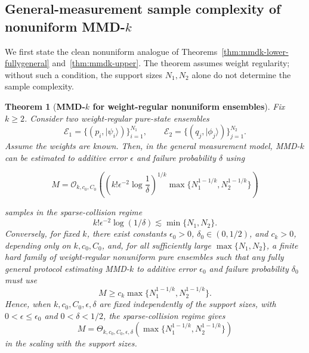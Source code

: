 \documentclass[aps,prx,reprint,superscriptaddress,amsmath,amssymb,longbibliography,floatfix]{revtex4-2}
\providecommand{\ket}[1]{|#1 \rangle}
\newcommand{\scE}{\mathcal{E}}
\newcommand{\scO}{\mathcal{O}}
\theoremstyle{plain}
\newtheorem{theorem}{Theorem}[section]
\theoremstyle{definition}
\theoremstyle{remark}
\begin{document}
\subsection{General-measurement sample complexity of nonuniform MMD-\(k\)}

We first state the clean nonuniform analogue of Theorems~\ref{thm:mmdk-lower-fullygeneral} and~\ref{thm:mmdk-upper}. The theorem assumes weight regularity; without such a condition, the support sizes \(N_1,N_2\) alone do not determine the sample complexity.

\begin{theorem}[\textbf{MMD-\(k\) for weight-regular nonuniform ensembles}]
    \label{thm: nonuniform weight regular MMD general}
    Fix \(k\ge2\). Consider two weight-regular pure-state ensembles
    \[
        \scE_1=\{(p_i,\ket{\psi_i})\}_{i=1}^{N_1},
        \qquad
        \scE_2=\{(q_j,\ket{\phi_j})\}_{j=1}^{N_2}.
    \]
    Assume the weights are known. Then, in the general measurement model, MMD-\(k\) can be estimated to additive error \(\epsilon\) and failure probability \(\delta\) using
    \begin{widetext}
\begin{equation}
        M
        =
        \scO_{k,c_0,C_0}\!\left(
            \left(k!\epsilon^{-2}\log\frac1\delta\right)^{1/k}
            \max\{N_1^{1-1/k},N_2^{1-1/k}\}
        \right)
        \label{eq: nonuniform MMD upper regular}
    \end{equation}
\end{widetext}
    samples in the sparse-collision regime
    \[
        k!\epsilon^{-2}\log(1/\delta)\lesssim \min\{N_1,N_2\}.
    \]
    Conversely, for fixed \(k\), there exist constants \(\epsilon_0>0\), \(\delta_0\in(0,1/2)\), and \(c_k>0\), depending only on \(k,c_0,C_0\), and, for all sufficiently large \(\max\{N_1,N_2\}\), a finite hard family of weight-regular nonuniform pure ensembles such that any fully general protocol estimating MMD-\(k\) to additive error \(\epsilon_0\) and failure probability \(\delta_0\) must use
    \begin{equation}
        M
        \ge
        c_k\max\{N_1^{1-1/k},N_2^{1-1/k}\}.
        \label{eq: nonuniform MMD lower regular}
    \end{equation}
    Hence, when \(k,c_0,C_0,\epsilon,\delta\) are fixed independently of the support sizes, with \(0<\epsilon\le\epsilon_0\) and \(0<\delta<1/2\), the sparse-collision regime gives
    \begin{equation}
        M
        =
        \Theta_{k,c_0,C_0,\epsilon,\delta}\!\left(
            \max\{N_1^{1-1/k},N_2^{1-1/k}\}
        \right)
    \end{equation}
    in the scaling with the support sizes.
\end{theorem}
\end{document}
